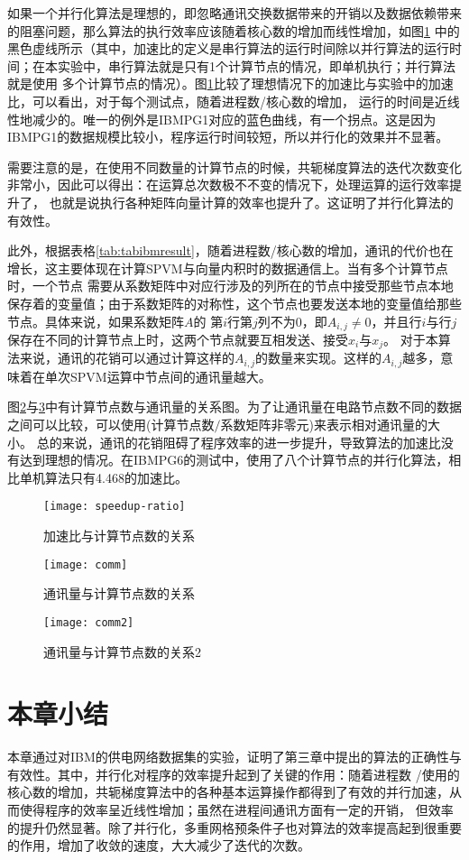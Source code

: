 如果一个并行化算法是理想的，即忽略通讯交换数据带来的开销以及数据依赖带来的阻塞问题，那么算法的执行效率应该随着核心数的增加而线性增加，如图\ref{fig:figspeedupratio}
中的黑色虚线所示（其中，加速比的定义是串行算法的运行时间除以并行算法的运行时间；在本实验中，串行算法就是只有1个计算节点的情况，即单机执行；并行算法就是使用
多个计算节点的情况）。图\ref{fig:figspeedupratio}比较了理想情况下的加速比与实验中的加速比，可以看出，对于每个测试点，随着进程数/核心数的增加，
运行的时间是近线性地减少的。唯一的例外是IBMPG1对应的蓝色曲线，有一个拐点。这是因为IBMPG1的数据规模比较小，程序运行时间较短，所以并行化的效果并不显著。

需要注意的是，在使用不同数量的计算节点的时候，共轭梯度算法的迭代次数变化非常小，因此可以得出：在运算总次数极不不变的情况下，处理运算的运行效率提升了，
也就是说执行各种矩阵向量计算的效率也提升了。这证明了并行化算法的有效性。

此外，根据表格\ref{tab:tabibmresult}，随着进程数/核心数的增加，通讯的代价也在增长，这主要体现在计算SPVM与向量内积时的数据通信上。当有多个计算节点时，一个节点
需要从系数矩阵中对应行涉及的列所在的节点中接受那些节点本地保存着的变量值；由于系数矩阵的对称性，这个节点也要发送本地的变量值给那些节点。具体来说，如果系数矩阵$A$的
第$i$行第$j$列不为0，即$A_{i,j}\neq 0$，并且行$i$与行$j$保存在不同的计算节点上时，这两个节点就要互相发送、接受$x_i$与$x_j$。
对于本算法来说，通讯的花销可以通过计算这样的$A_{i,j}$的数量来实现。这样的$A_{i,j}$越多，意味着在单次SPVM运算中节点间的通讯量越大。

图\ref{fig:figcomm}与\ref{fig:figcomm2}中有计算节点数与通讯量的关系图。为了让通讯量在电路节点数不同的数据之间可以比较，可以使用(计算节点数$/$系数矩阵非零元)来表示相对通讯量的大小。
总的来说，通讯的花销阻碍了程序效率的进一步提升，导致算法的加速比没有达到理想的情况。在IBMPG6的测试中，使用了八个计算节点的并行化算法，相比单机算法只有4.468的加速比。



\begin{figure}[H]
  \centering
  \texttt{[image: speedup-ratio]}
  \caption{加速比与计算节点数的关系}
  \label{fig:figspeedupratio}
\end{figure}

\begin{figure}[H]
  \centering
  \texttt{[image: comm]}
  \caption{通讯量与计算节点数的关系}
  \label{fig:figcomm}
\end{figure}


\begin{figure}[H]
  \centering
  \texttt{[image: comm2]}
  \caption{通讯量与计算节点数的关系2}
  \label{fig:figcomm2}
\end{figure}

\section{本章小结}

本章通过对IBM的供电网络数据集的实验，证明了第三章中提出的算法的正确性与有效性。其中，并行化对程序的效率提升起到了关键的作用：随着进程数
/使用的核心数的增加，共轭梯度算法中的各种基本运算操作都得到了有效的并行加速，从而使得程序的效率呈近线性增加；虽然在进程间通讯方面有一定的开销，
但效率的提升仍然显著。除了并行化，多重网格预条件子也对算法的效率提高起到很重要的作用，增加了收敛的速度，大大减少了迭代的次数。
